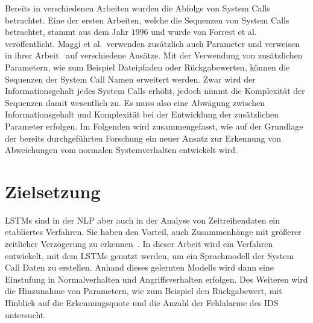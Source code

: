 Bereits in verschiedenen Arbeiten wurden die Abfolge von System Calls betrachtet.
Eine der ersten Arbeiten, welche die Sequenzen von System Calls betrachtet, stammt aus dem Jahr $1996$ und wurde von Forrest et al.~\cite{FORREST} veröffentlicht.
Maggi et al.\ verwenden zusätzlich auch Parameter und verweisen in ihrer Arbeit~\cite{MAGGI} auf verschiedene Ansätze.
Mit der Verwendung von zusätzlichen Parametern, wie zum Beispiel Dateipfaden oder Rückgabewerten, können die Sequenzen der System Call Namen erweitert werden.
Zwar wird der Informationsgehalt jedes System Calls erhöht, jedoch nimmt die Komplexität der Sequenzen damit wesentlich zu. 
Es muss also eine Abwägung zwischen Informationsgehalt und Komplexität bei der Entwicklung der zusätzlichen Parameter erfolgen.
Im Folgenden wird zusammengefasst, wie auf der Grundlage der bereits durchgeführten Forschung ein neuer Ansatz zur Erkennung von Abweichungen vom normalen Systemverhalten entwickelt wird.





\section{Zielsetzung}\label{sec:Forschungsfrage}

\acfp{LSTM} sind in der \ac{NLP} aber auch in der Analyse von Zeitreihendaten ein etabliertes Verfahren.
Sie haben den Vorteil, auch Zusammenhänge mit größerer zeitlicher Verzögerung zu erkennen~\cite{HOCHREITER}.
In dieser Arbeit wird ein Verfahren entwickelt, mit dem \acp{LSTM} genutzt werden, um ein Sprachmodell der System Call Daten zu erstellen.
Anhand dieses gelernten Modells wird dann eine Einstufung in Normalverhalten und Angriffsverhalten erfolgen.
Des Weiteren wird die Hinzunahme von Parametern, wie zum Beispiel den Rückgabewert, mit Hinblick auf die Erkennungsquote und die Anzahl der Fehlalarme des \acf{IDS} untersucht.

